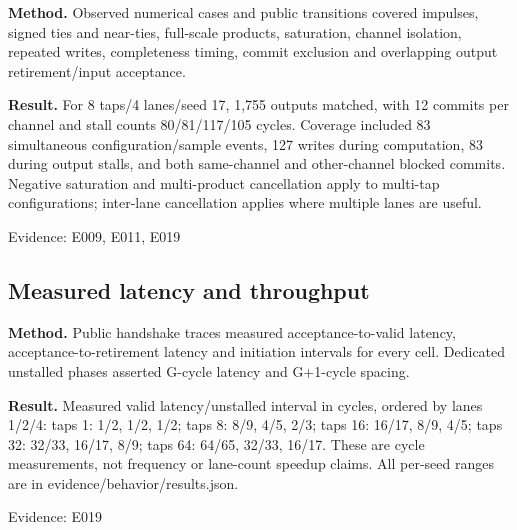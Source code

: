\documentclass[11pt,a4paper]{article}
\begin{document}
\textbf{Method.} Observed numerical cases and public transitions covered impulses,\allowbreak{} signed ties and near-ties,\allowbreak{} full-scale products,\allowbreak{} saturation,\allowbreak{} channel isolation,\allowbreak{} repeated writes,\allowbreak{} completeness timing,\allowbreak{} commit exclusion and overlapping output retirement/\allowbreak{}input acceptance.

\textbf{Result.} For 8 taps/\allowbreak{}4 lanes/\allowbreak{}seed 17,\allowbreak{} 1,\allowbreak{}755 outputs matched,\allowbreak{} with 12 commits per channel and stall counts 80/\allowbreak{}81/\allowbreak{}117/\allowbreak{}105 cycles. Coverage included 83 simultaneous configuration/\allowbreak{}sample events,\allowbreak{} 127 writes during computation,\allowbreak{} 83 during output stalls,\allowbreak{} and both same-channel and other-channel blocked commits. Negative saturation and multi-product cancellation apply to multi-tap configurations; inter-lane cancellation applies where multiple lanes are useful.

{\small Evidence: E009,\allowbreak{} E011,\allowbreak{} E019}

\subsection{Measured latency and throughput}

\textbf{Method.} Public handshake traces measured acceptance-to-valid latency,\allowbreak{} acceptance-to-retirement latency and initiation intervals for every cell. Dedicated unstalled phases asserted G-cycle latency and G+\allowbreak{}1-cycle spacing.

\textbf{Result.} Measured valid latency/\allowbreak{}unstalled interval in cycles,\allowbreak{} ordered by lanes 1/\allowbreak{}2/\allowbreak{}4: taps 1: 1/\allowbreak{}2,\allowbreak{} 1/\allowbreak{}2,\allowbreak{} 1/\allowbreak{}2; taps 8: 8/\allowbreak{}9,\allowbreak{} 4/\allowbreak{}5,\allowbreak{} 2/\allowbreak{}3; taps 16: 16/\allowbreak{}17,\allowbreak{} 8/\allowbreak{}9,\allowbreak{} 4/\allowbreak{}5; taps 32: 32/\allowbreak{}33,\allowbreak{} 16/\allowbreak{}17,\allowbreak{} 8/\allowbreak{}9; taps 64: 64/\allowbreak{}65,\allowbreak{} 32/\allowbreak{}33,\allowbreak{} 16/\allowbreak{}17. These are cycle measurements,\allowbreak{} not frequency or lane-count speedup claims. All per-seed ranges are in evidence/\allowbreak{}behavior/\allowbreak{}results.json.

{\small Evidence: E019}
\end{document}
